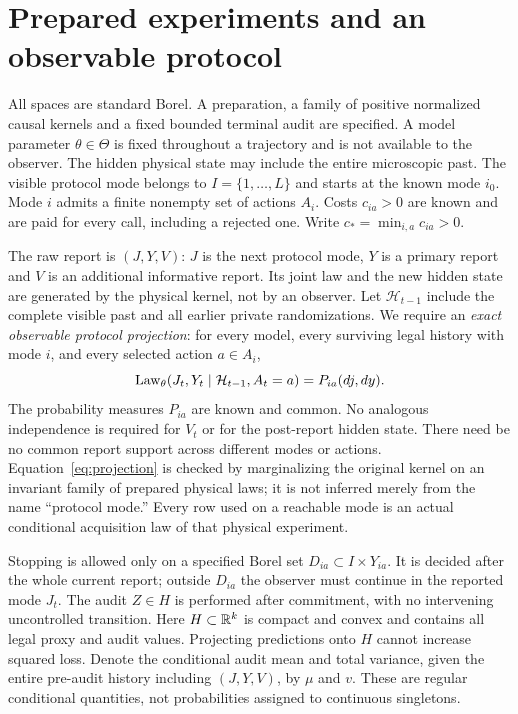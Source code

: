 \section{Prepared experiments and an observable protocol}
\label{sec:experiments}
All spaces are standard Borel. A preparation, a family of positive normalized causal kernels and a fixed bounded terminal audit are specified. A model parameter $\theta\in\Theta$ is fixed throughout a trajectory and is not available to the observer. The hidden physical state may include the entire microscopic past. The visible protocol mode belongs to $I=\{1,\ldots,L\}$ and starts at the known mode $i_0$. Mode $i$ admits a finite nonempty set of actions $A_i$. Costs $c_{ia}>0$ are known and are paid for every call, including a rejected one. Write $c_*=\min_{i,a}c_{ia}>0$.

The raw report is $(J,Y,V)$: $J$ is the next protocol mode, $Y$ is a primary report and $V$ is an additional informative report. Its joint law and the new hidden state are generated by the physical kernel, not by an observer. Let $\mathcal H_{t-1}$ include the complete visible past and all earlier private randomizations. We require an \emph{exact observable protocol projection}: for every model, every surviving legal history with mode $i$, and every selected action $a\in A_i$,
\begin{equation}\label{eq:projection}
 \operatorname{Law}_\theta(J_t,Y_t\mid\mathcal H_{t-1},A_t=a)=P_{ia}(dj,dy).
\end{equation}
The probability measures $P_{ia}$ are known and common. No analogous independence is required for $V_t$ or for the post-report hidden state. There need be no common report support across different modes or actions. Equation~\eqref{eq:projection} is checked by marginalizing the original kernel on an invariant family of prepared physical laws; it is not inferred merely from the name ``protocol mode.'' Every row used on a reachable mode is an actual conditional acquisition law of that physical experiment.

Stopping is allowed only on a specified Borel set $D_{ia}\subset I\times Y_{ia}$. It is decided after the whole current report; outside $D_{ia}$ the observer must continue in the reported mode $J_t$. The audit $Z\in H$ is performed after commitment, with no intervening uncontrolled transition. Here $H\subset\mathbb R^k$ is compact and convex and contains all legal proxy and audit values. Projecting predictions onto $H$ cannot increase squared loss. Denote the conditional audit mean and total variance, given the entire pre-audit history including $(J,Y,V)$, by $\mu$ and $v$. These are regular conditional quantities, not probabilities assigned to continuous singletons.


